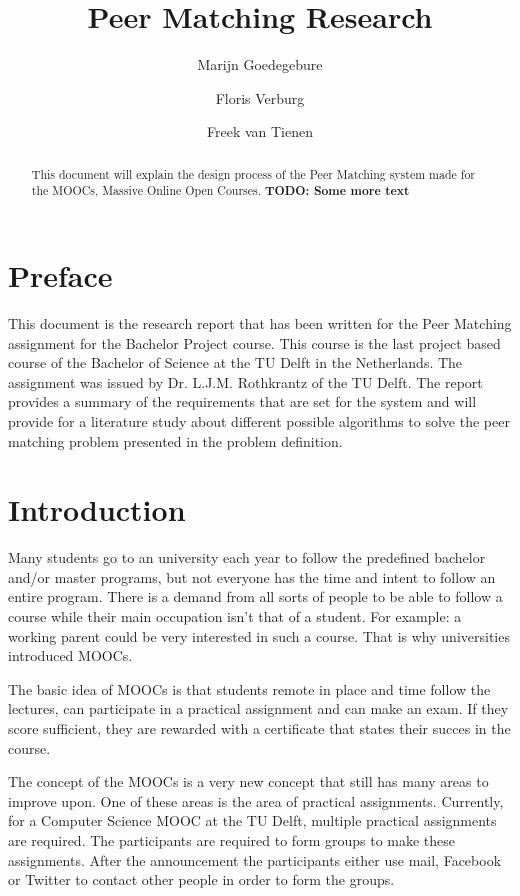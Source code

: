 \documentclass[]{article}
\title{Peer Matching Research}
\author{Marijn Goedegebure \and
	Floris Verburg \and
	Freek van Tienen}
\date{}
\newcommand{\TODO}[1]{{\color{red}\textbf{TODO: #1}}}
\begin{document}
\maketitle

\begin{abstract}
This document will explain the design process of the Peer Matching system made for the MOOCs, Massive Online Open Courses.
\TODO{Some more text}
\end{abstract}

\newpage

\tableofcontents

\newpage

\section{Preface}
This document is the research report that has been written for the Peer Matching assignment for the Bachelor Project course. This course is the last project based course of the Bachelor of Science at the TU Delft in the Netherlands. The assignment was issued by Dr. L.J.M. Rothkrantz of the TU Delft.
The report provides a summary of the requirements that are set for the system and will provide for a literature study about different possible algorithms to solve the peer matching problem presented in the problem definition.

\section{Introduction}
Many students go to an university each year to follow the predefined bachelor and/or master programs, but not everyone has the time and intent to follow an entire program.
There is a demand from all sorts of people to be able to follow a course while their main occupation isn't that of a student.
For example: a working parent could be very interested in such a course.
That is why universities introduced MOOCs.

The basic idea of MOOCs is that students remote in place and time follow the lectures, can participate in a practical assignment and can make an exam.
If they score sufficient, they are rewarded with a certificate that states their succes in the course.

The concept of the MOOCs is a very new concept that still has many areas to improve upon.
One of these areas is the area of practical assignments.
Currently, for a Computer Science MOOC at the TU Delft, multiple practical assignments are required.
The participants are required to form groups to make these assignments.
After the announcement the participants either use mail, Facebook or  Twitter to contact other people in order to form the groups.
\end{document}
